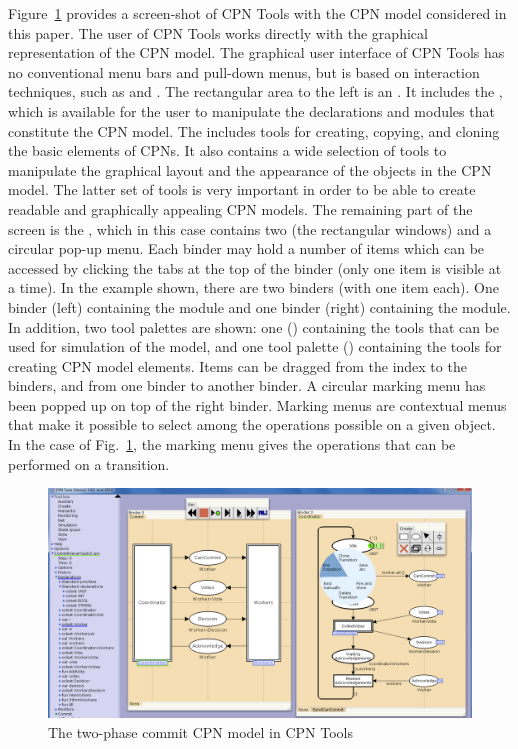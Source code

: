 Figure~\ref{fig:cpntools} provides a screen-shot of CPN Tools with the
CPN model considered in this paper. The user of CPN Tools works
directly with the graphical representation of the CPN model. The
graphical user interface of CPN Tools has no conventional menu bars
and pull-down menus, but is based on interaction techniques, such as
 and . The rectangular
area to the left is an . It includes the , which is available for the user to manipulate the declarations
and modules that constitute the CPN model. The 
includes tools for creating, copying, and cloning the basic elements
of CPNs. It also contains a wide selection of tools to manipulate the
graphical layout and the appearance of the objects in the CPN
model. The latter set of tools is very important in order to be able
to create readable and graphically appealing CPN models. The remaining
part of the screen is the , which in this case
contains two  (the rectangular windows) and a
circular pop-up menu. Each binder may hold a number of items which can
be accessed by clicking the tabs at the top of the binder (only one
item is visible at a time). In the example shown, there are two
binders (with one item each). One binder (left) containing the
 module and one binder (right) containing the
 module. In addition, two tool palettes are
shown: one () containing the tools that can be used for
simulation of the model, and one tool palette ()
containing the tools for creating CPN model elements. Items can be
dragged from the index to the binders, and from one binder to another
binder. A circular marking menu has been popped up on top of the right
binder. Marking menus are contextual menus that make it possible to
select among the operations possible on a given object. In the case of
Fig.~\ref{fig:cpntools}, the marking menu gives the operations that
can be performed on a transition.


\begin{figure}[t]
\centering
\includegraphics[scale=.37]{figures/cpntools.png}
\caption{The two-phase commit CPN model in CPN Tools}
\label{fig:cpntools}
\end{figure}


